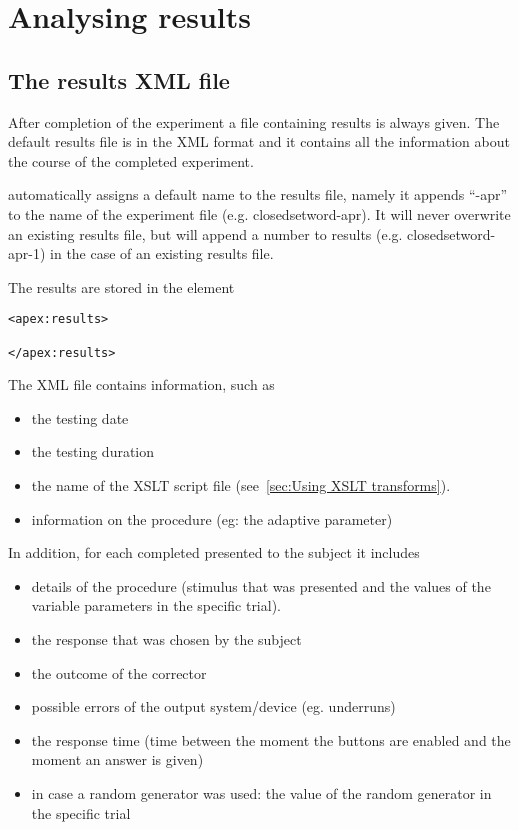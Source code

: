 \chapter{Analysing results}
\label{chap:Results}
\section{The results XML file}

After completion of the experiment a file containing results is
always given. The default results file is in the XML format and it
contains all the information about the course of the completed
experiment.

\apex automatically assigns a default name to the results file,
namely it appends ``-apr'' to the name of the experiment file
(e.g. closedsetword-apr). It will never overwrite an existing
results file, but will append a number to results (e.g.
closedsetword-apr-1) in the case of an existing results file.

The results are stored in the element
\begin{lstlisting}
<apex:results>

</apex:results>
\end{lstlisting}

The XML file contains  information, such as

\begin{itemize}
\item the testing date

\item the testing duration

\item the name of the XSLT script file (see~\ref{sec:Using XSLT
transforms}).

\item information on the procedure (eg: the adaptive parameter)

\end{itemize}

In addition, for each completed  presented to the
subject it includes

\begin{itemize}
\item details of the procedure (stimulus that was presented and
the values of the variable parameters in the specific trial).

\item the response that was chosen by the subject

\item the outcome of the corrector

\item possible errors of the output system/device (eg. underruns)

\item the response time (time between the moment the buttons are
 enabled and the moment an answer is given)


\item in case a random generator was used: the value of the random
generator in the specific trial
\end{itemize}

